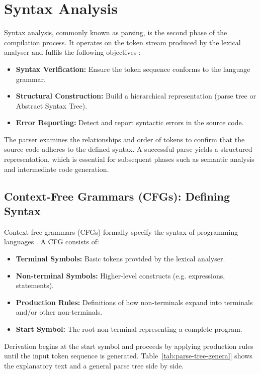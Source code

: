 \section{Syntax Analysis}

Syntax analysis, commonly known as parsing, is the second phase of the compilation process. It operates on the token stream produced by the lexical analyser and fulfils the following objectives \cite{aho2007compilers}:

\begin{itemize}
\item \textbf{Syntax Verification:} Ensure the token sequence conforms to the language grammar.
\item \textbf{Structural Construction:} Build a hierarchical representation (parse tree or Abstract Syntax Tree).
\item \textbf{Error Reporting:} Detect and report syntactic errors in the source code.
\end{itemize}

The parser examines the relationships and order of tokens to confirm that the source code adheres to the defined syntax. A successful parse yields a structured representation, which is essential for subsequent phases such as semantic analysis and intermediate code generation.

\subsection{Context-Free Grammars (CFGs): Defining Syntax}

Context-free grammars (CFGs) formally specify the syntax of programming languages \cite{aho2007compilers}. A CFG consists of:

\begin{itemize}
\item \textbf{Terminal Symbols:} Basic tokens provided by the lexical analyser.
\item \textbf{Non-terminal Symbols:} Higher-level constructs (e.g. expressions, statements).
\item \textbf{Production Rules:} Definitions of how non-terminals expand into terminals and/or other non-terminals.
\item \textbf{Start Symbol:} The root non-terminal representing a complete program.
\end{itemize}

Derivation begins at the start symbol and proceeds by applying production rules until the input token sequence is generated. Table~\ref{tab:parse-tree-general} shows the explanatory text and a general parse tree side by side.

